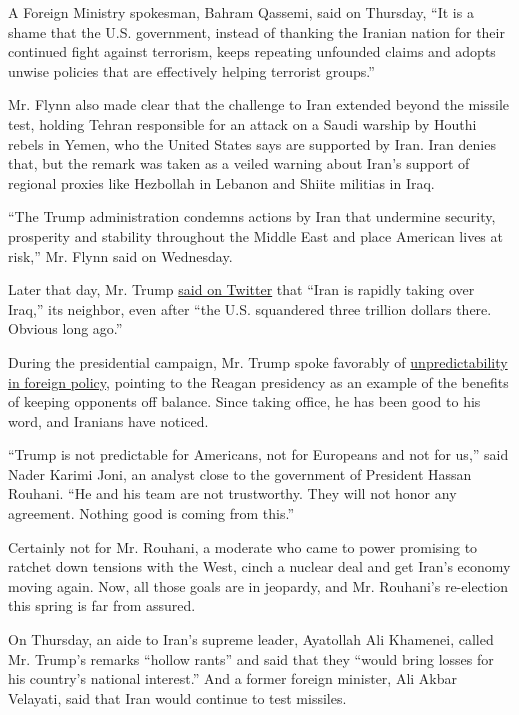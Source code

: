 A Foreign Ministry spokesman, Bahram Qassemi, said on Thursday, ``It is
a shame that the U.S. government, instead of thanking the Iranian nation
for their continued fight against terrorism, keeps repeating unfounded
claims and adopts unwise policies that are effectively helping terrorist
groups.''

Mr. Flynn also made clear that the challenge to Iran extended beyond the
missile test, holding Tehran responsible for an attack on a Saudi
warship by Houthi rebels in Yemen, who the United States says are
supported by Iran. Iran denies that, but the remark was taken as a
veiled warning about Iran's support of regional proxies like Hezbollah
in Lebanon and Shiite militias in Iraq.

``The Trump administration condemns actions by Iran that undermine
security, prosperity and stability throughout the Middle East and place
American lives at risk,'' Mr. Flynn said on Wednesday.

Later that day, Mr. Trump
\href{https://twitter.com/realDonaldTrump/status/826990079738540033}{said
on Twitter} that ``Iran is rapidly taking over Iraq,'' its neighbor,
even after ``the U.S. squandered three trillion dollars there. Obvious
long ago.''

During the presidential campaign, Mr. Trump spoke favorably of
\href{https://www.nytimes3xbfgragh.onion/2016/04/28/us/politics/donald-trump-foreign-policy-speech.html}{unpredictability
in foreign policy}, pointing to the Reagan presidency as an example of
the benefits of keeping opponents off balance. Since taking office, he
has been good to his word, and Iranians have noticed.

``Trump is not predictable for Americans, not for Europeans and not for
us,'' said Nader Karimi Joni, an analyst close to the government of
President Hassan Rouhani. ``He and his team are not trustworthy. They
will not honor any agreement. Nothing good is coming from this.''

Certainly not for Mr. Rouhani, a moderate who came to power promising to
ratchet down tensions with the West, cinch a nuclear deal and get Iran's
economy moving again. Now, all those goals are in jeopardy, and Mr.
Rouhani's re-election this spring is far from assured.

On Thursday, an aide to Iran's supreme leader, Ayatollah Ali Khamenei,
called Mr. Trump's remarks ``hollow rants'' and said that they ``would
bring losses for his country's national interest.'' And a former foreign
minister, Ali Akbar Velayati, said that Iran would continue to test
missiles.

